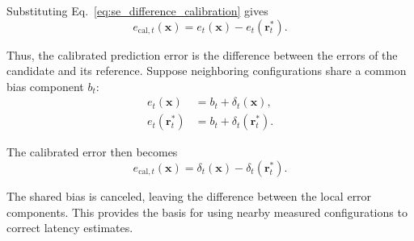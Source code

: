 Substituting Eq.~\ref{eq:se_difference_calibration} gives
\begin{equation}
    e_{\mathrm{cal},t}(\mathbf{x})
    =
    e_t(\mathbf{x})
    -
    e_t(\mathbf{r}_t^*).
    \label{eq:se_calibrated_error}
\end{equation}

Thus, the calibrated prediction error is the difference between the errors of the candidate and its reference. Suppose neighboring configurations share a common bias component $b_t$:
\begin{equation}
\begin{aligned}
    e_t(\mathbf{x})
    &=b_t+\delta_t(\mathbf{x}),\\
    e_t(\mathbf{r}_t^*)
    &=b_t+\delta_t(\mathbf{r}_t^*).
\end{aligned}
\label{eq:se_bias_decomposition}
\end{equation}

The calibrated error then becomes
\begin{equation}
    e_{\mathrm{cal},t}(\mathbf{x})
    =
    \delta_t(\mathbf{x})
    -
    \delta_t(\mathbf{r}_t^*).
    \label{eq:se_bias_cancellation}
\end{equation}

The shared bias is canceled, leaving the difference between the local error components. This provides the basis for using nearby measured configurations to correct latency estimates.
